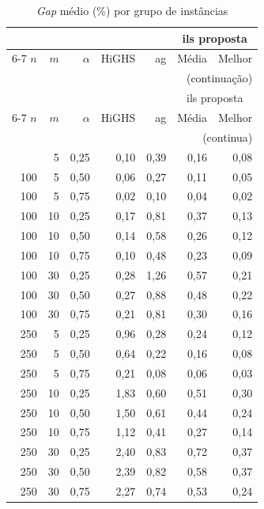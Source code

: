 {\small
\begin{longtable}{@{}rrrrrrr@{}}
  \caption{\emph{Gap} médio (\%) por grupo de instâncias}
  \label{tab:resultados:detalhados} \\
  \toprule
  & & & & & \multicolumn{2}{c}{\acs{ils} proposta} \\
  \cmidrule(l){6-7}
  $n$ & $m$ & $\alpha$ & HiGHS & \acs{ag} & Média & Melhor \\
  \midrule
  \endfirsthead
  \multicolumn{7}{r}{\footnotesize(continuação)} \\
  \toprule
  & & & & & \multicolumn{2}{c}{\acs{ils} proposta} \\
  \cmidrule(l){6-7}
  $n$ & $m$ & $\alpha$ & HiGHS & \acs{ag} & Média & Melhor \\
  \midrule
  \endhead
  \midrule
  \multicolumn{7}{r}{\footnotesize(continua)} \\
  \endfoot
  \bottomrule
  \endlastfoot
    100 & 5 & 0,25 & 0,10 & 0,39 & 0,16 & 0,08 \\
    100 & 5 & 0,50 & 0,06 & 0,27 & 0,11 & 0,05 \\
    100 & 5 & 0,75 & 0,02 & 0,10 & 0,04 & 0,02 \\
    100 & 10 & 0,25 & 0,17 & 0,81 & 0,37 & 0,13 \\
    100 & 10 & 0,50 & 0,14 & 0,58 & 0,26 & 0,12 \\
    100 & 10 & 0,75 & 0,10 & 0,48 & 0,23 & 0,09 \\
    100 & 30 & 0,25 & 0,28 & 1,26 & 0,57 & 0,21 \\
    100 & 30 & 0,50 & 0,27 & 0,88 & 0,48 & 0,22 \\
    100 & 30 & 0,75 & 0,21 & 0,81 & 0,30 & 0,16 \\
    \midrule
    250 & 5 & 0,25 & 0,96 & 0,28 & 0,24 & 0,12 \\
    250 & 5 & 0,50 & 0,64 & 0,22 & 0,16 & 0,08 \\
    250 & 5 & 0,75 & 0,21 & 0,08 & 0,06 & 0,03 \\
    250 & 10 & 0,25 & 1,83 & 0,60 & 0,51 & 0,30 \\
    250 & 10 & 0,50 & 1,50 & 0,61 & 0,44 & 0,24 \\
    250 & 10 & 0,75 & 1,12 & 0,41 & 0,27 & 0,14 \\
    250 & 30 & 0,25 & 2,40 & 0,83 & 0,72 & 0,37 \\
    250 & 30 & 0,50 & 2,39 & 0,82 & 0,58 & 0,37 \\
    250 & 30 & 0,75 & 2,27 & 0,74 & 0,53 & 0,24 \\
    \midrule

\end{longtable}}
